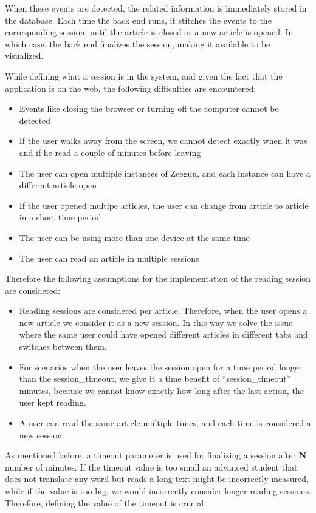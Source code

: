 When these events are detected, the related information is immediately stored in the database. Each time the back end runs, it stitches the events to the corresponding session, until the article is closed or a new article is opened. In which case, the back end finalizes the session, making it available to be visualized.

While defining what a session is in the system, and given the fact that the application is on the web, the following difficulties are encountered:
\begin{itemize}
	\item Events like closing the browser or turning off the computer cannot be detected
	\item If the user walks away from the screen, we cannot detect exactly when it was and if he read a couple of minutes before leaving
	\item The user can open multiple instances of Zeeguu, and each instance can have a different article open
	\item If the user opened multipe articles, the user can change from article to article in a short time period
	\item The user can be using more than one device at the same time
	\item The user can read an article in multiple sessions
\end{itemize}

Therefore the following assumptions for the implementation of the reading session are considered:
\begin{itemize}
\item Reading sessions are considered per article. Therefore, when the user opens a new article we consider it as a new session. In this way we solve the issue where the same user could have opened different articles in different tabs and switches between them.

\item For scenarios when the user leaves the session open for a time period longer than the session\_timeout, we give it a time benefit of “session\_timeout” minutes, because we cannot know exactly how long after the last action, the user kept reading. 

\item A user can read the same article multiple times, and each time is considered a new session.
\end{itemize}

As mentioned before, a timeout parameter is used for finalizing a session after \textbf{N} number of minutes. If the timeout value is too small an advanced student that does not translate any word but reads a long text might be incorrectly measured, while if the value is too big, we would incorrectly consider longer reading sessions. Therefore, defining the value of the timeout is crucial. 


